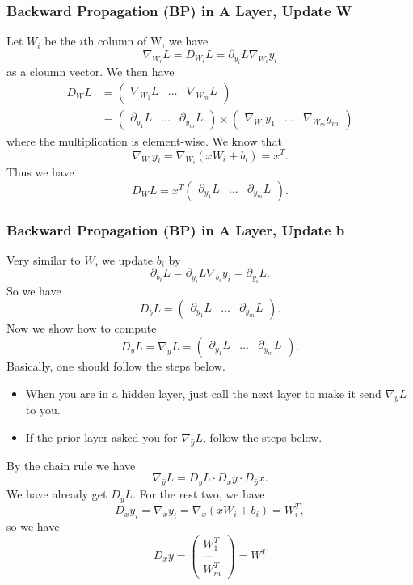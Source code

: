 \subsubsection{Backward Propagation (BP) in A Layer, Update W}
Let $W_i$ be the $i$th column of W, we have
\[\nabla_{W_i}L=D_{W_i}L=\partial_{y_i}L\nabla_{W_i}y_i\]
as a cloumn vector. We then have
\[
\begin{split}
D_WL&=
\begin{pmatrix} \nabla_{W_1}L & \dots & \nabla_{W_m}L
\end{pmatrix}\\
&=
\begin{pmatrix}
\partial_{y_1}L & \dots &\partial_{y_m}L
\end{pmatrix}
\times
\begin{pmatrix}
\nabla_{W_1}y_1 & \dots & \nabla_{W_m}y_m
\end{pmatrix}
\end{split}
\]
where the multiplication is element-wise.
We know that
\[
\nabla_{W_i}y_i=\nabla_{W_i}{(xW_i+b_i)}=x^T.
\]
Thus we have
\[
D_WL=x^T
\begin{pmatrix}
\partial_{y_1}L & \dots &\partial_{y_m}L
\end{pmatrix}.
\]

\subsubsection{Backward Propagation (BP) in A Layer, Update b}
Very similar to $W$, we update $b_i$ by
\[\partial_{b_i}L=\partial_{y_i}L\nabla_{b_i}y_i=\partial_{y_i}L.\]
So we have
\[D_bL=
\begin{pmatrix}
\partial_{y_1}L & \dots &\partial_{y_m}L
\end{pmatrix}.
\]
Now we show how to compute
\[
D_yL=\nabla_yL=
\begin{pmatrix}
\partial_{y_1}L & \dots &\partial_{y_m}L
\end{pmatrix}.
\]
Basically, one should follow the steps below.
\begin{itemize}
\item When you are in a hidden layer, just call the next layer to make it send $\nabla_yL$ to you.
\item If the prior layer asked you for $\nabla_{\hat y}L$, follow the steps below.
\end{itemize}
By the chain rule we have
\[
\nabla_{\hat y}L=D_{y}L\cdot D_xy\cdot D_{\hat y}x.
\]
We have already get $D_yL$. For the rest two, we have
\[
D_xy_i=\nabla_xy_i=\nabla_x(xW_i+b_i)=W_i^T,
\]
so we have
\[
D_xy=
\begin{pmatrix}
W_1^T \\ \dots\\ W_m^T
\end{pmatrix}
=W^T
\]

